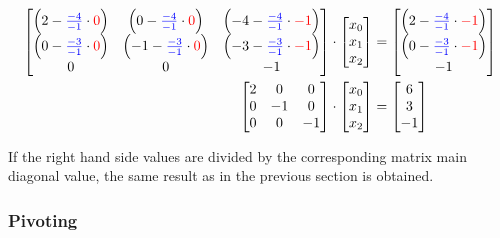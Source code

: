 \documentclass[fontsize = 10pt,DIV = 13]{scrartcl}
\begin{document}
\begin{align*}
\begin{bmatrix}
\left(2 - \textcolor{blue}{\frac{-4}{-1}} \cdot \textcolor{red}{0} \right)&
\left(0 - \textcolor{blue}{\frac{-4}{-1}} \cdot \textcolor{red}{0} \right)&
\left(-4 - \textcolor{blue}{\frac{-4}{-1}} \cdot \textcolor{red}{-1} \right)\\
\left(0 - \textcolor{blue}{\frac{-3}{-1}} \cdot \textcolor{red}{0} \right)&
\left(-1 - \textcolor{blue}{\frac{-3}{-1}} \cdot \textcolor{red}{0} \right)&
\left(-3 - \textcolor{blue}{\frac{-3}{-1}} \cdot \textcolor{red}{-1} \right)\\
0&
0&
-1\\
\end{bmatrix}
&\cdot
\begin{bmatrix}
x_0\\
x_1\\
x_2\\
\end{bmatrix}
=
\begin{bmatrix}
\left(2 - \textcolor{blue}{\frac{-4}{-1}} \cdot \textcolor{red}{-1} \right)\\
\left(0 - \textcolor{blue}{\frac{-3}{-1}} \cdot \textcolor{red}{-1} \right)\\
-1\\
\end{bmatrix}
\\
\begin{bmatrix}
2&0&0\\
0&-1&0\\
0&0&-1\\
\end{bmatrix}
&\cdot
\begin{bmatrix}
x_0\\
x_1\\
x_2\\
\end{bmatrix}
=
\begin{bmatrix}
6\\
3\\
-1\\
\end{bmatrix}
\end{align*}

If the right hand side values are divided by the corresponding matrix main diagonal value, the same result as in the previous section is obtained.


\subsubsection{Pivoting}
\end{document}
